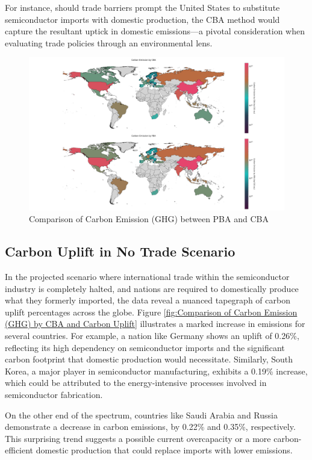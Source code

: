 For instance, should trade barriers prompt the United States to substitute semiconductor imports with domestic production, the CBA method would capture the resultant uptick in domestic emissions—a pivotal consideration when evaluating trade policies through an environmental lens.
\ifincludefigures
\begin{figure}
  \centering
  \includegraphics[width=\linewidth]{figures/Graph/Comparison of Carbon Emission (GHG) between PBA and CBA.png}
 \caption{Comparison of Carbon Emission (GHG) between PBA and CBA}\label{fig:Comparison of Carbon Emission (GHG) between PBA and CBA}
\end{figure}
\fi

\subsection{Carbon Uplift in No Trade Scenario}
In the projected scenario where international trade within the semiconductor industry is completely halted, and nations are required to domestically produce what they formerly imported, the data reveal a nuanced tapegraph of carbon uplift percentages across the globe. Figure \ref{fig:Comparison of Carbon Emission (GHG) by CBA and Carbon Uplift} illustrates a marked increase in emissions for several countries. For example, a nation like Germany shows an uplift of 0.26\%, reflecting its high dependency on semiconductor imports and the significant carbon footprint that domestic production would necessitate. Similarly, South Korea, a major player in semiconductor manufacturing, exhibits a 0.19\% increase, which could be attributed to the energy-intensive processes involved in semiconductor fabrication.

On the other end of the spectrum, countries like Saudi Arabia and Russia demonstrate a decrease in carbon emissions, by 0.22\% and 0.35\%, respectively. This surprising trend suggests a possible current overcapacity or a more carbon-efficient domestic production that could replace imports with lower emissions.

